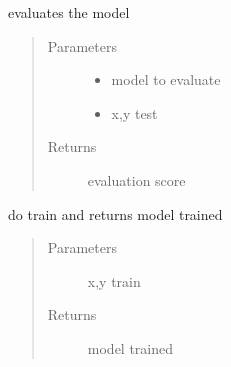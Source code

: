 \documentclass[letterpaper,10pt,english]{sphinxmanual}
\begin{document}

\begin{fulllineitems}
\label{\detokenize{algorithms:algorithms.ira.ira_trainer.do_test}}
\sphinxAtStartPar
evaluates the model
\begin{quote}\begin{description}
\item[{Parameters}] \leavevmode\begin{itemize}
\item {} 
\sphinxAtStartPar
{} \textendash{} model to evaluate

\item {} 
\sphinxAtStartPar
{} \textendash{} x,y test

\end{itemize}

\item[{Returns}] \leavevmode
\sphinxAtStartPar
evaluation score

\end{description}\end{quote}

\end{fulllineitems}


\begin{fulllineitems}
\label{\detokenize{algorithms:algorithms.ira.ira_trainer.do_train}}
\sphinxAtStartPar
do train and returns model trained
\begin{quote}\begin{description}
\item[{Parameters}] \leavevmode
\sphinxAtStartPar
{} \textendash{} x,y train

\item[{Returns}] \leavevmode
\sphinxAtStartPar
model trained

\end{description}\end{quote}

\end{fulllineitems}
\end{document}
